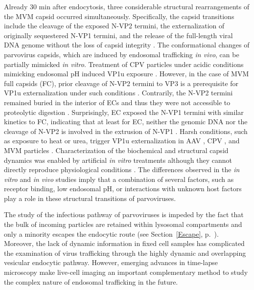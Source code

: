 Already 30 min after endocytosis, three considerable structural rearrangements of the MVM capsid occurred simultaneously. Specifically, the capsid transitions include the cleavage of the exposed N-VP2 termini, the externalization of originally sequestered N-VP1 termini, and the release of the full-length viral DNA genome without the loss of capsid integrity \cite{pmid16379002}. The conformational changes of parvovirus capsids, which are induced by endosomal trafficking \textit{in vivo}, can be partially mimicked \textit{in vitro}. Treatment of CPV particles under acidic conditions mimicking endosomal pH induced VP1u exposure \cite{pmid14644609}. However, in the case of MVM full capsids (FC), prior cleavage of N-VP2 termini to VP3 is a prerequisite for VP1u externalization under such conditions \cite{pmid9927584, pmid16352540}. Contrarily, the N-VP2 termini remained buried in the interior of ECs and thus they were not accessible to proteolytic digestion \cite{pmid16379002}. Surprisingly, EC exposed the N-VP1 termini with similar kinetics to FC, indicating that at least for EC, neither the genomic DNA nor the cleavage of N-VP2 is involved in the extrusion of N-VP1 \cite{pmid9927584, pmid16379002}. Harsh conditions, such as exposure to heat or urea, trigger VP1u externalization in AAV \cite{pmid15827144}, CPV \cite{pmid11799183, pmid9770425}, and MVM particles \cite{pmid9927584, pmid19955311}. Characterization of the biochemical and structural capsid dynamics was enabled by artificial \textit{in vitro} treatments although they cannot directly reproduce physiological conditions \cite{pmid9927584, pmid19955311, pmid15827144, pmid11799183}. The differences observed in the \textit{in vitro} and \textit{in vivo} studies imply that a combination of several factors, such as receptor binding, low endosomal pH, or interactions with unknown host factors play a role in these structural transitions of parvoviruses.       

The study of the infectious pathway of parvoviruses is impeded by the fact that the bulk of incoming particles are retained within lysosomal compartments and only a minority escapes the endocytic route (see Section~\ref{Escape}, p.~\pageref{Escape}). Moreover, the lack of dynamic information in fixed cell samples has complicated the examination of virus trafficking through the highly dynamic and overlapping vesicular endocytic pathway. However, emerging advances in time-lapse microscopy make live-cell imaging an important complementary method to study the complex nature of endosomal trafficking in the future.

